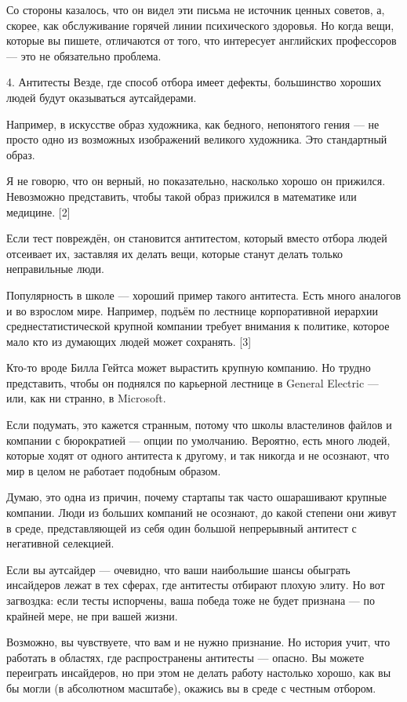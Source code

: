 \documentclass[ebook,12pt,oneside,openany]{memoir}
\begin{document}
Со стороны казалось, что он видел эти письма не источник ценных
советов, а, скорее, как обслуживание горячей линии психического
здоровья. Но когда вещи, которые вы пишете, отличаются от того, что
интересует английских профессоров — это не обязательно проблема.

4. Антитесты Везде, где способ отбора имеет дефекты, большинство
хороших людей будут оказываться аутсайдерами.

Например, в искусстве образ художника, как бедного, непонятого гения —
не просто одно из возможных изображений великого художника. Это
стандартный образ.

Я не говорю, что он верный, но показательно, насколько хорошо он
прижился. Невозможно представить, чтобы такой образ прижился в
математике или медицине. [2]

Если тест повреждён, он становится антитестом, который вместо отбора
людей отсеивает их, заставляя их делать вещи, которые станут делать
только неправильные люди.

Популярность в школе — хороший пример такого антитеста. Есть много
аналогов и во взрослом мире. Например, подъём по лестнице
корпоративной иерархии среднестатистической крупной компании требует
внимания к политике, которое мало кто из думающих людей может
сохранять. [3]

Кто-то вроде Билла Гейтса может вырастить крупную компанию. Но трудно
представить, чтобы он поднялся по карьерной лестнице в General
Electric — или, как ни странно, в Microsoft.

Если подумать, это кажется странным, потому что школы властелинов
файлов и компании с бюрократией — опции по умолчанию. Вероятно, есть
много людей, которые ходят от одного антитеста к другому, и так
никогда и не осознают, что мир в целом не работает подобным образом.

Думаю, это одна из причин, почему стартапы так часто ошарашивают
крупные компании. Люди из больших компаний не осознают, до какой
степени они живут в среде, представляющей из себя один большой
непрерывный антитест с негативной селекцией.

Если вы аутсайдер — очевидно, что ваши наибольшие шансы обыграть
инсайдеров лежат в тех сферах, где антитесты отбирают плохую элиту. Но
вот загвоздка: если тесты испорчены, ваша победа тоже не будет
признана — по крайней мере, не при вашей жизни.

Возможно, вы чувствуете, что вам и не нужно признание. Но история
учит, что работать в областях, где распространены антитесты — опасно.
Вы можете переиграть инсайдеров, но при этом не делать работу
настолько хорошо, как вы бы могли (в абсолютном масштабе), окажись вы
в среде с честным отбором.
\end{document}
